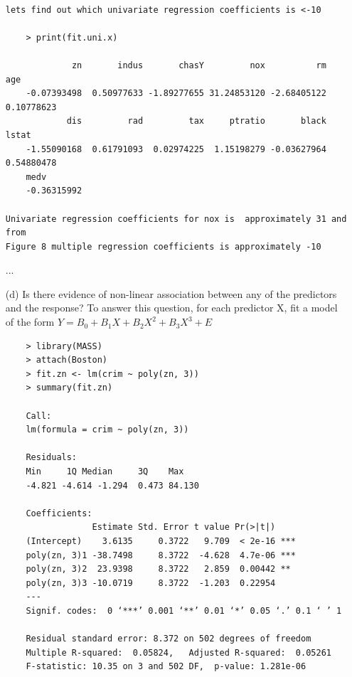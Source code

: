 \documentclass{article}
\begin{document}
\begin{itemize}
\begin{program}
	\begin{verbatim}

lets find out which univariate regression coefficients is <-10

	> print(fit.uni.x)
	
	         zn       indus       chasY         nox          rm         age 
	-0.07393498  0.50977633 -1.89277655 31.24853120 -2.68405122  0.10778623 
	        dis         rad         tax     ptratio       black       lstat 
	-1.55090168  0.61791093  0.02974225  1.15198279 -0.03627964  0.54880478 
	medv 
	-0.36315992 

Univariate regression coefficients for nox is  approximately 31 and from 
Figure 8 multiple regression coefficients is approximately -10
	\end{verbatim}
\end{program}

\newpage
...
\newpage





\item[(d)] Is there evidence of non-linear association between any of the predictors and the response? To answer this question, for each predictor X, fit a model of the form
$Y = B_0 +B_1X +B_2X^2 +B_3X^3 +E $




\begin{program}
	\begin{verbatim}
	> library(MASS)
	> attach(Boston)
	> fit.zn <- lm(crim ~ poly(zn, 3))
	> summary(fit.zn)
	
	Call:
	lm(formula = crim ~ poly(zn, 3))
	
	Residuals:
	Min     1Q Median     3Q    Max 
	-4.821 -4.614 -1.294  0.473 84.130 
	
	Coefficients:
	             Estimate Std. Error t value Pr(>|t|)    
	(Intercept)    3.6135     0.3722   9.709  < 2e-16 ***
	poly(zn, 3)1 -38.7498     8.3722  -4.628  4.7e-06 ***
	poly(zn, 3)2  23.9398     8.3722   2.859  0.00442 ** 
	poly(zn, 3)3 -10.0719     8.3722  -1.203  0.22954    
	---
	Signif. codes:  0 ‘***’ 0.001 ‘**’ 0.01 ‘*’ 0.05 ‘.’ 0.1 ‘ ’ 1
	
	Residual standard error: 8.372 on 502 degrees of freedom
	Multiple R-squared:  0.05824,	Adjusted R-squared:  0.05261 
	F-statistic: 10.35 on 3 and 502 DF,  p-value: 1.281e-06
	
	\end{verbatim}
\end{program}



\end{itemize}
\end{document}
